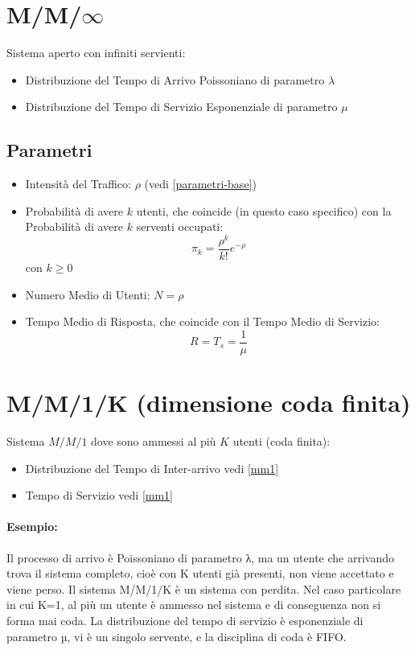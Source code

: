 \section{M/M/\texorpdfstring{$\infty$}{infinito}}

Sistema aperto con infiniti servienti:

\begin{itemize}
    \item Distribuzione del Tempo di Arrivo Poissoniano di parametro $\lambda$
    \item Distribuzione del Tempo di Servizio Esponenziale di parametro $\mu$
\end{itemize}

\subsection{Parametri}

\begin{itemize}
    \item Intensità del Traffico: $\rho$ (vedi \ref{parametri-base})
    \item Probabilità di avere $k$ utenti, che coincide (in questo caso
          specifico) con la Probabilità di avere $k$ serventi occupati: $$\pi_k =
              \frac{\rho^k}{k!} e^{-\rho}$$ con $k \geq 0$
    \item Numero Medio di Utenti: $N = \rho$
    \item Tempo Medio di Risposta, che coincide con il Tempo Medio di Servizio:
          $$R = T_s = \frac{1}{\mu}$$
\end{itemize}

\section{M/M/1/K (dimensione coda finita)}

Sistema $M/M/1$ dove sono ammessi al più $K$ utenti (coda finita):

\begin{itemize}
    \item Distribuzione del Tempo di Inter-arrivo vedi \ref{mm1}
    \item Tempo di Servizio vedi \ref{mm1}
\end{itemize}

\paragraph{Esempio:}
Il processo di arrivo è Poissoniano di parametro λ, ma un utente che arrivando
trova il sistema completo, cioè con K utenti già presenti, non viene accettato e
viene perso. Il sistema M/M/1/K è un sistema con perdita. Nel caso particolare
in cui K=1, al più un utente è ammesso nel sistema e di conseguenza non si forma
mai coda. La distribuzione del tempo di servizio è esponenziale di parametro µ,
vi è un singolo servente, e la disciplina di coda è FIFO.

